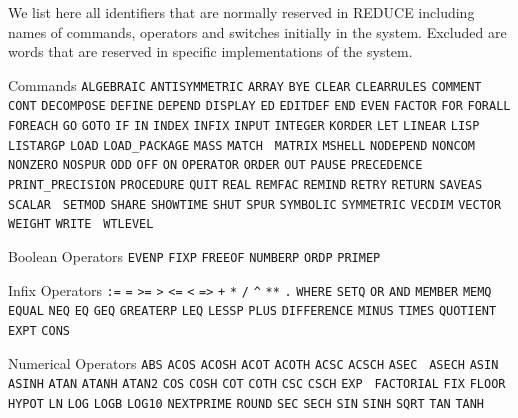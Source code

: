 \documentclass[11pt,letterpaper]{book}
\renewcommand{\sloppy}{\tolerance=9999\relax%
                       \setlength{\emergencystretch}{0.2\hsize}}
\newcommand{\REDUCE}{REDUCE}
\begin{document}
We list here all identifiers that are normally reserved in \REDUCE{}
including names of commands, operators and switches initially in the system.
Excluded are words that are reserved in specific implementations of the
system.

\vspace{13pt}
\begin{list}{}{\renewcommand{\makelabel}[1]{#1\hspace{\fill}}%
               \settowidth{\labelwidth}{Numerical Operators}%
               \setlength{\labelsep}{1em}%
               \sloppy}

\item[Commands] {\tt ALGEBRAIC} {\tt ANTISYMMETRIC}
{\tt ARRAY} {\tt BYE} {\tt CLEAR} \linebreak
{\tt CLEARRULES} {\tt COMMENT} {\tt
CONT} {\tt DECOMPOSE} {\tt DEFINE} {\tt DEPEND} {\tt DISPLAY} {\tt ED}
{\tt EDITDEF} {\tt END} {\tt EVEN} {\tt FACTOR} {\tt FOR} {\tt FORALL}
{\tt FOREACH} {\tt GO} {\tt GOTO} {\tt IF} {\tt IN} {\tt INDEX} {\tt INFIX}
{\tt INPUT} {\tt INTEGER} {\tt KORDER} {\tt LET} {\tt LINEAR} {\tt LISP}
{\tt LISTARGP} {\tt LOAD} {\tt LOAD\_PACKAGE} {\tt MASS} {\tt MATCH} {\tt
MATRIX} {\tt MSHELL} {\tt NODEPEND} {\tt NONCOM} {\tt NONZERO} {\tt NOSPUR}
{\tt ODD} {\tt OFF}
{\tt ON} {\tt OPERATOR} {\tt ORDER} {\tt OUT} {\tt PAUSE} {\tt PRECEDENCE}
{\tt PRINT\_PRECISION} {\tt PROCEDURE} {\tt QUIT} {\tt REAL} {\tt REMFAC}
{\tt REMIND} {\tt RETRY} {\tt RETURN} {\tt SAVEAS} {\tt SCALAR} {\tt
SETMOD} {\tt SHARE} {\tt SHOWTIME} {\tt SHUT} {\tt SPUR} {\tt SYMBOLIC}
{\tt SYMMETRIC} {\tt VECDIM} {\tt VECTOR} {\tt WEIGHT} {\tt WRITE} {\tt
WTLEVEL}

\item[Boolean Operators] {\tt EVENP} {\tt FIXP}
{\tt FREEOF} {\tt NUMBERP} {\tt ORDP} {\tt PRIMEP}

\item[Infix Operators]
 \verb|:=| \verb|=| \verb|>=| \verb|>| \verb|<=| \verb|<| \verb|=>|
 \verb|+| \verb|*| \verb|/| \verb|^| \verb|**| \verb|.| {\tt WHERE}
{\tt SETQ} {\tt OR} {\tt AND} {\tt MEMBER} {\tt MEMQ} {\tt
EQUAL} {\tt NEQ} {\tt EQ} {\tt GEQ} {\tt GREATERP} {\tt LEQ} {\tt LESSP}
{\tt PLUS} {\tt DIFFERENCE} {\tt MINUS} {\tt TIMES} {\tt QUOTIENT} {\tt
EXPT} {\tt CONS}

\item[Numerical Operators] {\tt ABS} {\tt ACOS}
{\tt ACOSH} {\tt ACOT} {\tt ACOTH} {\tt ACSC} {\tt ACSCH} {\tt ASEC} {\tt
ASECH} {\tt ASIN} {\tt ASINH} {\tt ATAN} {\tt ATANH} {\tt ATAN2} {\tt COS}
{\tt COSH} {\tt COT} {\tt COTH} {\tt CSC} {\tt CSCH} {\tt EXP} {\tt
FACTORIAL} {\tt FIX} {\tt FLOOR} {\tt HYPOT} {\tt LN} {\tt LOG} {\tt LOGB}
{\tt LOG10} {\tt NEXTPRIME} {\tt ROUND} {\tt SEC} {\tt SECH} {\tt SIN}
{\tt SINH} {\tt SQRT} {\tt TAN} {\tt TANH}


\end{list}
\end{document}
